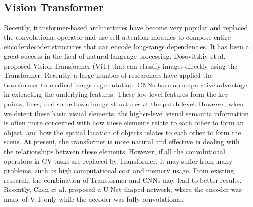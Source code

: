 \subsection{Vision Transformer}
Recently, transformer-based architectures have become very popular and replaced the convolutional operator and use self-attention modules to compose entire
encoderdecoder structures that can encode long-range dependencies.
It has been a great success in the field of natural language processing.
Dosovitskiy et al. proposed Vision Transformer (ViT) that can classify
images directly using the Transformer.
Recently, a large number of researchers have applied the transformer to medical
image segmentation. CNNs have a comparative advantage in extracting the
underlying features. These low-level features form the key points, lines, and
some basic image structures at the patch level. However, when we detect these
basic visual elements, the higher-level visual semantic information is often
more concerned with how these elements relate to each other to form an object,
and how the spatial location of objects relates to each other to form the scene.
At present, the transformer is more natural and effective in dealing with the
relationships between these elements. However, if all the convolutional
operators in CV tasks are replaced by Transformer, it may suffer from many
problems, such as high computational cost and memory usage. From existing research, the combination of Transformer and CNNs may lead to better results.
Recently, Chen et al. proposed a U-Net shaped network, where the encoder was
made of ViT only while the decoder was fully convolutional.

